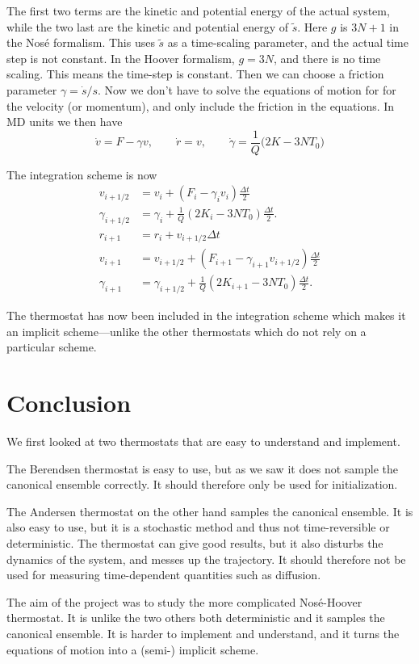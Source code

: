 \documentclass[12pt]{article}
\numberwithin{equation}{section}
\numberwithin{figure}{section}
\begin{document}
The first two terms are the kinetic and potential energy of
the actual system, while the two last are the kinetic
and potential energy of $\tilde s$.
Here $g$ is $3N + 1$ in the Nosé formalism. This uses
$\tilde s$ as a time-scaling parameter, and the actual time step is
not constant. In the Hoover formalism, $g=3N$, and there is no time
scaling. This means the time-step is constant.
Then we can choose a friction parameter $\gamma = \dot s/s$.
Now we don't have to solve the equations of motion for
for the velocity (or momentum), and only include
the friction in the equations. In MD units we then have
\begin{equation}
    \dot{v} = F - \gamma v, \qquad \dot{r} 
    = v, \qquad \dot{\gamma} = \frac{1}{Q}\bigg(2K - 3NT_0\bigg)
\end{equation}


The integration scheme is now
\begin{align}
v_{i+1/2} 
    &= v_{i} + (F_i - \gamma_i v_i)\frac{\Delta t}{2} \\
\gamma_{i+1/2} 
    &= \gamma_i + \frac{1}{Q}(2K_i - 3NT_0)\frac{\Delta t}{2}. \\
r_{i+1} 
    &= r_{i} + v_{i+1/2}\Delta t \\
v_{i+1} 
    &= v_{i+1/2} + (F_{i+1} - \gamma_{i+1} v_{i+1/2})\frac{\Delta t}{2} \\
\gamma_{i+1} 
    &= \gamma_{i+1/2} + \frac{1}{Q}(2K_{i+1} - 3NT_0)\frac{\Delta t}{2}.	
\end{align}

The thermostat has now been included in the integration scheme
which makes it an implicit scheme---unlike the other thermostats
which do not rely on a particular scheme.

\section{Conclusion}
We first looked at two thermostats that are easy to understand
and implement.

The Berendsen thermostat is easy to use, but as we saw it does
not sample the canonical ensemble correctly. It should
therefore only be used for initialization.

The Andersen thermostat on the other hand samples the canonical ensemble.
It is also easy to use, but it is a stochastic method
and thus not time-reversible or deterministic.
The thermostat can give good results, but it also disturbs the dynamics
of the system, and messes up the trajectory.
It should therefore not be used for measuring time-dependent
quantities such as diffusion.

The aim of the project was to study the more complicated Nosé-Hoover
thermostat. It is unlike the two others both deterministic and
it samples the canonical ensemble.
It is harder to implement and understand, and it turns
the equations of motion into a (semi-) implicit scheme.
\end{document}

